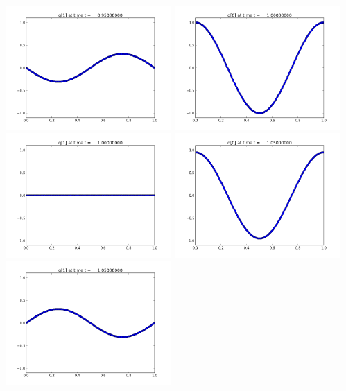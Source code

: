 \documentclass[11pt]{article}
\begin{document}
\includegraphics[width=0.475\textwidth]{frame0019fig1.png}
\vskip 10pt 
\includegraphics[width=0.475\textwidth]{frame0020fig0.png}
\includegraphics[width=0.475\textwidth]{frame0020fig1.png}
\vskip 10pt 
\includegraphics[width=0.475\textwidth]{frame0021fig0.png}
\includegraphics[width=0.475\textwidth]{frame0021fig1.png}
\end{document}

